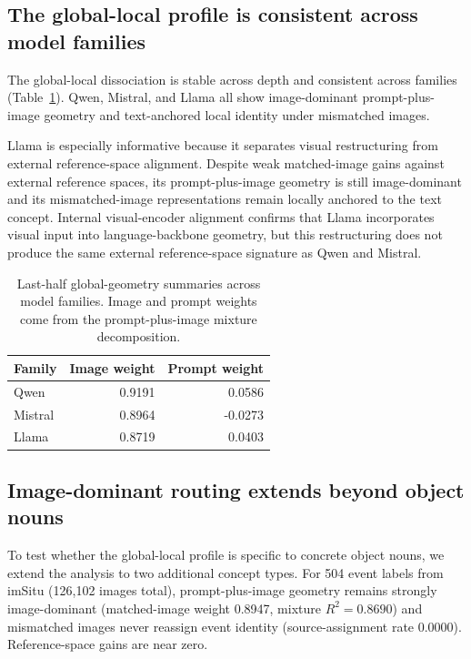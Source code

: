 \documentclass{article}
\begin{document}
\subsection{The global-local profile is consistent across model families}

The global-local dissociation is stable across depth and consistent across families (Table~\ref{tab:global_local_family}). Qwen, Mistral, and Llama all show image-dominant prompt-plus-image geometry and text-anchored local identity under mismatched images.

Llama is especially informative because it separates visual restructuring from external reference-space alignment. Despite weak matched-image gains against external reference spaces, its prompt-plus-image geometry is still image-dominant and its mismatched-image representations remain locally anchored to the text concept. Internal visual-encoder alignment confirms that Llama incorporates visual input into language-backbone geometry, but this restructuring does not produce the same external reference-space signature as Qwen and Mistral.

\begin{table}[!htbp]
\centering
\caption{Last-half global-geometry summaries across model families. Image and prompt weights come from the prompt-plus-image mixture decomposition.}
\label{tab:global_local_family}
\scriptsize
\begin{tabular}{lrr}
  \toprule
  Family & Image weight & Prompt weight \\
  \midrule
  Qwen & 0.9191 & 0.0586 \\
  Mistral & 0.8964 & -0.0273 \\
  Llama & 0.8719 & 0.0403 \\
  \bottomrule
\end{tabular}
\end{table}

\subsection{Image-dominant routing extends beyond object nouns}

To test whether the global-local profile is specific to concrete object nouns, we extend the analysis to two additional concept types. For 504 event labels from imSitu (126,102 images total), prompt-plus-image geometry remains strongly image-dominant (matched-image weight 0.8947, mixture \(R^2 = 0.8690\)) and mismatched images never reassign event identity (source-assignment rate 0.0000). Reference-space gains are near zero.
\end{document}
